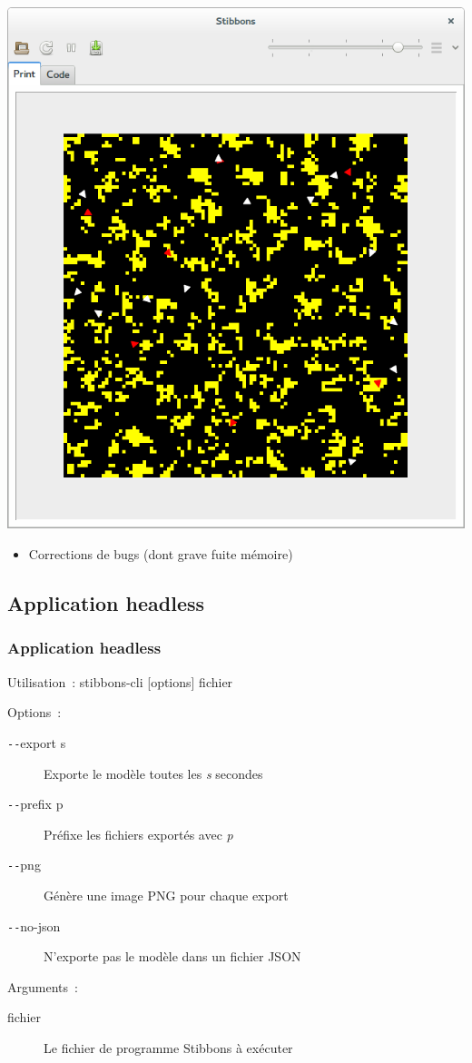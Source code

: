 \begin{frame}
\begin{center}
\includegraphics[scale=0.16]{doc/report/screenshot/stibbons-0-5-3.png}
\end{center}

\begin{itemize}
	\item Corrections de bugs (dont grave fuite mémoire)
\end{itemize}
\end{frame}

\subsection{Application headless}

\begin{frame}
\frametitle{Application headless}

Utilisation~: stibbons-cli [options] fichier

Options~:
\begin{description}
	\item[\texttt{-{}-}export s] Exporte le modèle toutes les \emph{s} secondes
	\item[\texttt{-{}-}prefix p] Préfixe les fichiers exportés avec \emph{p}
	\item[\texttt{-{}-}png] Génère une image PNG pour chaque export
	\item[\texttt{-{}-}no-json] N'exporte pas le modèle dans un fichier JSON
\end{description}

Arguments~:
\begin{description}
	\item[fichier] Le fichier de programme Stibbons à exécuter
\end{description}

\end{frame}

